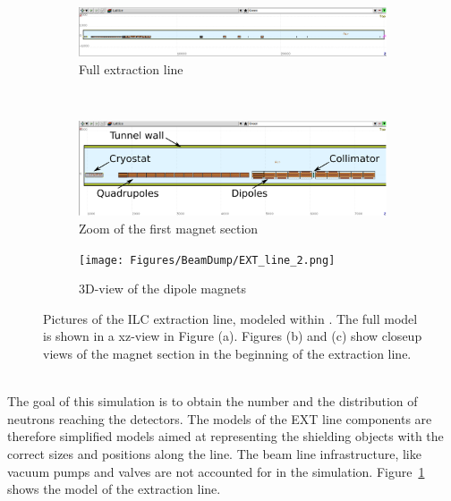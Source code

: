 \begin{figure}[!b]
 \centering
  \begin{subfigure}[b]{\textwidth}
   \centering
    \includegraphics[width=\textwidth]{Figures/BeamDump/EXT_line.png}
   \caption{Full extraction line}
   \end{subfigure}\\
   \begin{subfigure}[b]{0.63\textwidth}
   \centering
    \includegraphics[width=\textwidth]{Figures/BeamDump/EXT_line_1.png}
   \caption{Zoom of the first magnet section}
   \end{subfigure}
   \hfill
    \begin{subfigure}[b]{0.35\textwidth}
   \centering
    \texttt{[image: Figures/BeamDump/EXT\_line\_2.png]}
   \caption{3D-view of the dipole magnets}
   \end{subfigure}
   \caption[\fluka model of the ILC extraction line]{Pictures of the ILC extraction line, modeled within \flair.
   The full model is shown in a xz-view in Figure (a).
   Figures (b) and (c) show closeup views of the magnet section in the beginning of the extraction line.}
   \label{fig:BeamDumps:EXT}
\end{figure} 
\\The goal of this \fluka simulation is to obtain the number and the distribution of neutrons reaching the detectors.
The models of the EXT line components are therefore simplified models aimed at representing the shielding objects with the correct sizes and positions along the line.
The beam line infrastructure, like vacuum pumps and valves are not accounted for in the simulation.
Figure~\ref{fig:BeamDumps:EXT} shows the \fluka model of the extraction line.

